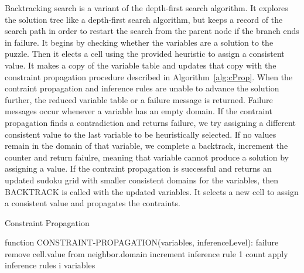 Backtracking search is a variant of the depth-first search algorithm.
It explores the solution tree like a depth-first search algorithm, but keeps a record of the search path in order to restart the search from the parent node if the branch ends in failure.
It begins by checking whether the variables are a solution to the puzzle.
Then it elects a cell using the provided heuristic to assign a consistent value.
It makes a copy of the variable table and updates that copy with the constraint propagation procedure described in Algorithm~\ref{alg:cProp}.
When the contraint propagation and inference rules are unable to advance the solution further, the reduced variable table or a failure message is returned.
Failure messages occur whenever a variable has an empty domain.
If the contraint propagation finds a contradiction and returns failure, we try assigning a different consistent value to the last variable to be heuristically selected.
If no values remain in the domain of that variable, we complete a backtrack, increment the counter and return faiulre, meaning that variable cannot produce a solution by assigning a value.
If the contraint propagation is successful and returns an updated sudoku grid with smaller consistent domains for the variables, then BACKTRACK is called with the updated variables. 
It selects a new cell to assign a consistent value and propagates the contraints.

\begin{algorithm}[H]
    \caption{Constraint Propagation}
    \label{alg:cProp}   
    \begin{algorithmic}
        \STATE function CONSTRAINT-PROPAGATION(variables, inferenceLevel):
                \RETURN failure
            \ENDIF
                        \STATE remove cell.value from neighbor.domain
                            \STATE increment inference rule 1 count
                        \ENDIF
                    \ENDFOR
                \ENDIF
            \ENDFOR
                \STATE apply inference rules i
            \ENDFOR
        \ENDWHILE
        \RETURN variables
    \end{algorithmic}
\end{algorithm}


